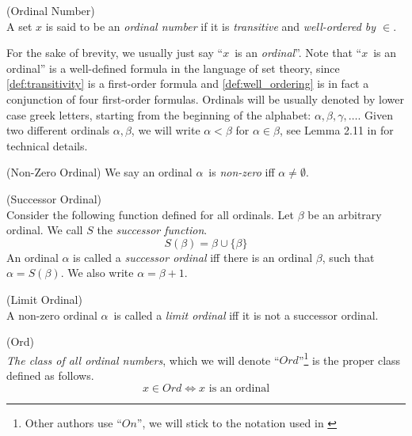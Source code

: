 \begin{definition}{(Ordinal Number)}\label{def:ordinal}\\ %
A set $x$ is said to be an \emph{ordinal number} if it is \emph{transitive} and \emph{well-ordered by $\in$}. 
\end{definition}
For the sake of brevity, we usually just say ``$x$~is an \emph{ordinal}''. 
Note that ``$x$~is an ordinal'' is a well-defined formula in the language of set theory, since \ref{def:transitivity} is a first-order formula and \ref{def:well_ordering} is in fact a conjunction of four first-order formulas.
Ordinals will be usually denoted by lower case greek letters, starting from the beginning of the alphabet: $\alpha, \beta, \gamma, \ldots$.
Given two different ordinals $\alpha, \beta$, we will write $\alpha < \beta$ for $\alpha \in \beta$, see Lemma 2.11 in \cite{JechBook} for technical details.

\begin{definition}{(Non-Zero Ordinal)} %
We say an ordinal $\alpha$ is \emph{non-zero} iff $\alpha \neq \emptyset$.
\end{definition}

\begin{definition}{(Successor Ordinal)}\label{def:successor_ordinal}\\ %
Consider the following function defined for all ordinals. Let $\beta$ be an arbitrary ordinal. We call $S$ the \emph{successor function}.
\begin{equation}
S(\beta) = \beta \cup \{\beta\}
\end{equation}
An ordinal $\alpha$ is called a \emph{successor ordinal} iff there is an ordinal $\beta$, such that $\alpha = S(\beta)$. We also write $\alpha = \beta+1$.
\end{definition}

\begin{definition}{(Limit Ordinal)}\label{def:limit_ordinal}\\ %
A non-zero ordinal $\alpha$ is called a \emph{limit ordinal} iff it is not a successor ordinal.
\end{definition}

\begin{definition}{(Ord)}\label{def:ord}\\  %
\emph{The class of all ordinal numbers}, which we will denote ``$Ord$''\footnote{Other authors use ``$On$'', we will stick to the notation used in \cite{JechBook}} is the proper class defined as follows.
\begin{equation}
x \in Ord \iff x\mbox{ is an ordinal}
\end{equation}
\end{definition}

